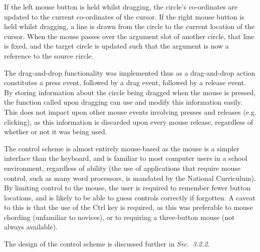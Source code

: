\documentclass[12pt,twoside,notitlepage,xetex]{report}
\begin{document}
{If the left mouse button is held whilst dragging, the circle's co-ordinates are updated to the current co-ordinates of the cursor.  If the right mouse button is held whilst dragging, a line is drawn from the circle to the current location of the cursor.  When the mouse passes over the argument slot of another circle, that line is fixed, and the target circle is updated such that the argument is now a reference to the source circle.

The drag-and-drop functionality was implemented thus as a drag-and-drop action constitutes a press event, followed by a drag event, followed by a release event.  By storing information about the circle being dragged when the mouse is pressed, the function called upon dragging can use and modify this information easily.  This does not impact upon other mouse events involving presses and releases (e.g. clicking), as this information is discarded upon every mouse release, regardless of whether or not it was being used.

The control scheme is almost entirely mouse-based as the mouse is a simpler interface than the keyboard, and is familiar to most computer users in a school environment, regardless of ability (the use of applications that require mouse control, such as many word processors, is mandated by the National Curriculum).  By limiting control to the mouse, the user is required to remember fewer button locations, and is likely to be able to guess controls correctly if forgotten.  A caveat to this is that the use of the Ctrl key is required, as this was preferable to mouse chording (unfamiliar to novices), or to requiring a three-button mouse (not always available).

The design of the control scheme is discussed further in \emph{Sec.~3.2.2}. %

%
%
}
\end{document}

